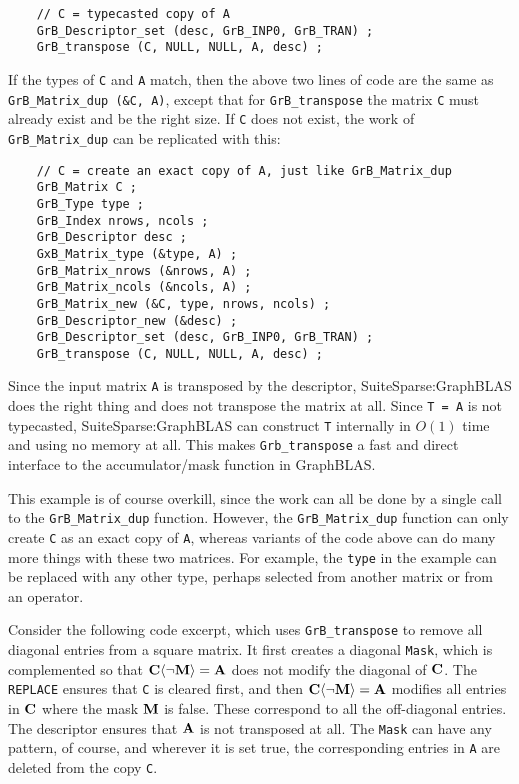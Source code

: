 \documentclass[12pt]{article}
\begin{document}
    {\footnotesize
    \begin{verbatim}
    // C = typecasted copy of A
    GrB_Descriptor_set (desc, GrB_INP0, GrB_TRAN) ;
    GrB_transpose (C, NULL, NULL, A, desc) ; \end{verbatim}}

If the types of \verb'C' and \verb'A' match,
then the above two lines of code are the
same as \verb'GrB_Matrix_dup (&C, A)', except that for \verb'GrB_transpose' the
matrix \verb'C' must already exist and be the right size.  If \verb'C' does not
exist, the work of \verb'GrB_Matrix_dup' can be replicated with this:

    {\footnotesize
    \begin{verbatim}
    // C = create an exact copy of A, just like GrB_Matrix_dup
    GrB_Matrix C ;
    GrB_Type type ;
    GrB_Index nrows, ncols ;
    GrB_Descriptor desc ;
    GxB_Matrix_type (&type, A) ;
    GrB_Matrix_nrows (&nrows, A) ;
    GrB_Matrix_ncols (&ncols, A) ;
    GrB_Matrix_new (&C, type, nrows, ncols) ;
    GrB_Descriptor_new (&desc) ;
    GrB_Descriptor_set (desc, GrB_INP0, GrB_TRAN) ;
    GrB_transpose (C, NULL, NULL, A, desc) ; \end{verbatim}}

Since the input matrix \verb'A' is transposed by the descriptor,
SuiteSparse:Graph\-BLAS does the right thing and does not transpose the matrix
at all.  Since \verb'T = A' is not typecasted, SuiteSparse:GraphBLAS can
construct \verb'T' internally in $O(1)$ time and using no memory at all.   This
makes \verb'Grb_transpose' a fast and direct interface to the accumulator/mask
function in GraphBLAS.

This example is of course overkill, since the work can all be done by a
single call to the \verb'GrB_Matrix_dup' function.  However, the
\verb'GrB_Matrix_dup' function can only create \verb'C' as an exact copy of
\verb'A', whereas variants of the code above can do many more things with these
two matrices.  For example, the \verb'type' in the example can be replaced with
any other type, perhaps selected from another matrix or from an operator.

Consider the following code excerpt, which uses \verb'GrB_transpose' to remove
all diagonal entries from a square matrix.  It first creates a diagonal
\verb'Mask', which is complemented so that ${\bf C \langle \neg M \rangle =A}$
does not modify the diagonal of ${\bf C}$.  The \verb'REPLACE' ensures that
\verb'C' is cleared first, and then ${\bf C \langle \neg M \rangle = A}$
modifies all entries in ${\bf C}$ where the mask ${\bf M}$ is false.  These
correspond to all the off-diagonal entries.  The descriptor ensures that ${\bf
A}$ is not transposed at all.  The \verb'Mask' can have any pattern, of course,
and wherever it is set true, the corresponding entries in \verb'A' are
deleted from the copy \verb'C'.
\end{document}
